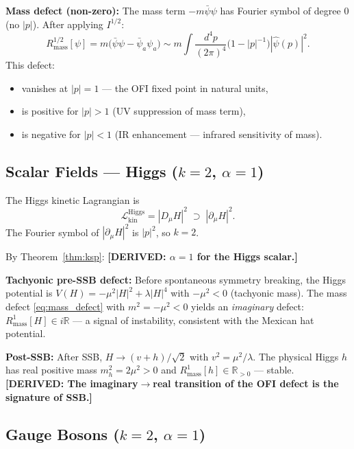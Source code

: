 \documentclass[12pt]{article}
\theoremstyle{definition}
\newcommand{\R}{\mathbb{R}}
\newcommand{\abs}[1]{\left|#1\right|}
\newcommand{\DERIVED}[1]{\textcolor{derivedcolor}{\textbf{[DERIVED: #1]}}}
\begin{document}
\textbf{Mass defect (non-zero):} The mass term $-m\bar\psi\psi$ has
Fourier symbol of degree $0$ (no $\abs{p}$).  After applying $I^{1/2}$:
\begin{equation}
  \boxed{
  R^{1/2}_{\mathrm{mass}}[\psi]
  = m\bigl(\bar\psi\psi - \bar\psi_a\psi_a\bigr)
  \sim m\int \frac{d^4p}{(2\pi)^4}\bigl(1-\abs{p}^{-1}\bigr)\abs{\hat\psi(p)}^2.
  }
  \label{eq:mass_defect}
\end{equation}
This defect:
\begin{itemize}
  \item vanishes at $\abs{p}=1$ — the OFI fixed point in natural units,
  \item is positive for $\abs{p}>1$ (UV suppression of mass term),
  \item is negative for $\abs{p}<1$ (IR enhancement — infrared sensitivity of mass).
\end{itemize}

\subsection{Scalar Fields — Higgs ($k=2$, $\alpha=1$)}

The Higgs kinetic Lagrangian is
\begin{equation}
  \mathcal{L}_{\mathrm{kin}}^{\mathrm{Higgs}}
  = \abs{D_\mu H}^2
  \;\supset\; \abs{\partial_\mu H}^2.
\end{equation}
The Fourier symbol of $\abs{\partial_\mu H}^2$ is $\abs{p}^2$, so $k=2$.

By Theorem~\ref{thm:ksp}: \DERIVED{$\alpha = 1$ for the Higgs scalar.}

\textbf{Tachyonic pre-SSB defect:} Before spontaneous symmetry breaking,
the Higgs potential is $V(H) = -\mu^2\abs{H}^2 + \lambda\abs{H}^4$ with
$-\mu^2 < 0$ (tachyonic mass).  The mass defect \eqref{eq:mass_defect}
with $m^2 = -\mu^2 < 0$ yields an \emph{imaginary} defect:
$R^1_{\mathrm{mass}}[H] \in i\R$ — a signal of instability,
consistent with the Mexican hat potential.

\textbf{Post-SSB:} After SSB, $H \to (v+h)/\sqrt{2}$ with $v^2 = \mu^2/\lambda$.
The physical Higgs $h$ has real positive mass $m_h^2 = 2\mu^2 > 0$ and
$R^1_{\mathrm{mass}}[h] \in \R_{>0}$ — stable.  \DERIVED{The imaginary$\to$real transition
of the OFI defect is the signature of SSB.}

\subsection{Gauge Bosons ($k=2$, $\alpha=1$)}
\end{document}
